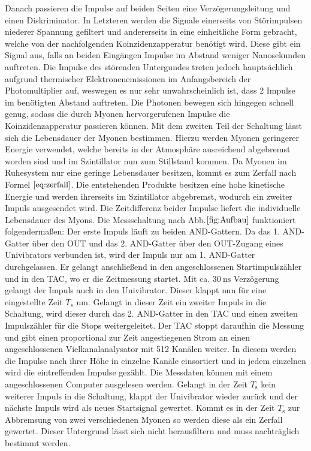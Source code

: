    Danach passieren die Impulse auf beiden Seiten eine Verzögerungsleitung und einen Diskriminator. In Letzteren werden die Signale einerseits von Störimpulsen niederer Spannung gefiltert und andererseits in eine einheitliche Form gebracht, welche von der nachfolgenden Koinzidenzapperatur benötigt wird.
     Diese gibt ein Signal aus, falls an beiden Eingängen Impulse im Abstand weniger Nanosekunden auftreten. Die Impulse des störenden Untergundes treten jedoch hauptsächlich aufgrund thermischer Elektronenemissionen im Anfangsbereich der Photomultiplier auf, weswegen es nur sehr unwahrscheinlich ist, dass 2 Impulse im benötigten Abstand auftreten. Die Photonen bewegen sich hingegen schnell genug, sodass die durch Myonen hervorgerufenen Impulse die Koinzidenzapperatur passieren können.
    Mit dem zweiten Teil der Schaltung lässt sich die Lebensdauer der Myonen bestimmen. Hierzu werden Myonen geringerer Energie verwendet, welche bereits in der Atmosphäre ausreichend abgebremst worden sind und im Szintillator nun zum Stillstand kommen.
    Da Myonen im Ruhesystem nur eine geringe Lebensdauer besitzen, kommt es zum Zerfall nach Formel $\eqref{eq:zerfall}$. Die entstehenden Produkte besitzen eine hohe kinetische Energie und werden ihrerseits im Szintillator abgebremst, wodurch ein zweiter Impuls ausgesendet wird. Die Zeitdifferenz beider Impulse liefert die individuelle Lebensdauer des Myons. Die Messschaltung nach Abb.$ \ref{fig:Aufbau}$ funktioniert folgendermaßen:
    Der erste Impuls läuft zu beiden AND-Gattern. Da das 1. AND-Gatter über den $\overline{\text{OUT}}$  und das 2. AND-Gatter über den OUT-Zugang eines Univibrators verbunden ist, wird der Impuls nur am 1. AND-Gatter durchgelassen. Er gelangt anschließend in den angeschlossenen Startimpulszähler und in den TAC, wo er die Zeitmessung startet. Mit ca. $\SI{30}{\nano\second}$ Verzögerung gelangt der Impuls auch in den Univibrator. Dieser klappt nun für eine eingestellte Zeit $T_s$ um. Gelangt in dieser Zeit ein zweiter Impuls in die Schaltung, wird dieser durch das 2. AND-Gatter in den TAC und einen zweiten Impulszähler für die Stops weitergeleitet. Der TAC stoppt daraufhin die Messung und gibt einen proportional zur Zeit angestiegenen Strom an einen angeschlossenen Vielkanalanalysator mit 512 Kanälen weiter. In diesem werden die Impulse nach ihrer Höhe in einzelne Kanäle einsortiert und in jedem einzelnen wird die eintreffenden Impulse gezählt. Die Messdaten können mit einem angeschlossenen Computer ausgelesen werden. Gelangt in der Zeit $T_\text{s}$ kein weiterer Impuls in die Schaltung, klappt der Univibrator wieder zurück und der nächste Impuls wird als neues Startsignal gewertet. Kommt es in der Zeit $T_\text{s}$ zur Abbremsung von zwei verschiedenen Myonen so werden diese als ein Zerfall gewertet. Dieser Untergrund lässt sich nicht herausfiltern und muss nachträglich bestimmt werden.